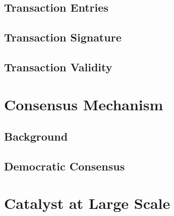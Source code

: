 \documentclass[a4paper, 12pt]{book}
\begin{document}
\section{Transaction Entries}\label{Sec:TEnt}



\section{Transaction Signature}\label{Sec:Sig}




\section{Transaction Validity} \label{Sec:Val}





\chapter{Consensus Mechanism} \label{Cha:CM}





\section{Background}\label{Sec:Cbg}



\section{Democratic Consensus}\label{Sec:Dem}




\chapter{Catalyst at Large Scale} \label{Cha:Sha}



\end{document}
